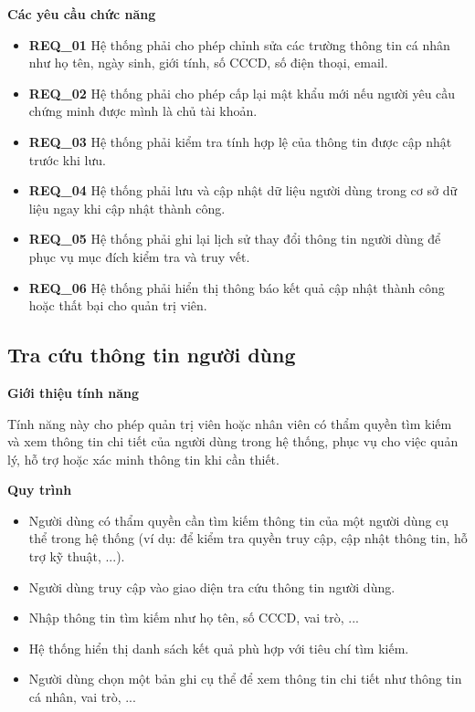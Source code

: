 \noindent \textbf{Các yêu cầu chức năng}

\begin{itemize} 
    \item \textbf{REQ\_01} Hệ thống phải cho phép chỉnh sửa các trường thông tin cá nhân như họ tên, ngày sinh, giới tính, số CCCD, số điện thoại, email. 
    \item \textbf{REQ\_02} Hệ thống phải cho phép cấp lại mật khẩu mới nếu người yêu cầu chứng minh được mình là chủ tài khoản. 
    \item \textbf{REQ\_03} Hệ thống phải kiểm tra tính hợp lệ của thông tin được cập nhật trước khi lưu. 
    \item \textbf{REQ\_04} Hệ thống phải lưu và cập nhật dữ liệu người dùng trong cơ sở dữ liệu ngay khi cập nhật thành công. 
    \item \textbf{REQ\_05} Hệ thống phải ghi lại lịch sử thay đổi thông tin người dùng để phục vụ mục đích kiểm tra và truy vết. 
    \item \textbf{REQ\_06} Hệ thống phải hiển thị thông báo kết quả cập nhật thành công hoặc thất bại cho quản trị viên.
\end{itemize}


\subsection{Tra cứu thông tin người dùng}

\noindent \textbf{Giới thiệu tính năng}

Tính năng này cho phép quản trị viên hoặc nhân viên có thẩm quyền tìm kiếm và xem thông tin chi tiết của người dùng trong hệ thống, phục vụ cho việc quản lý, hỗ trợ hoặc xác minh thông tin khi cần thiết.

\noindent \textbf{Quy trình}

\begin{itemize}

    \item Người dùng có thẩm quyền cần tìm kiếm thông tin của một người dùng cụ thể trong hệ thống (ví dụ: để kiểm tra quyền truy cập, cập nhật thông tin, hỗ trợ kỹ thuật, ...).

    \item Người dùng truy cập vào giao diện tra cứu thông tin người dùng.

    \item Nhập thông tin tìm kiếm như họ tên, số CCCD, vai trò, ...

    \item Hệ thống hiển thị danh sách kết quả phù hợp với tiêu chí tìm kiếm.

    \item Người dùng chọn một bản ghi cụ thể để xem thông tin chi tiết như thông tin cá nhân, vai trò, ...

\end{itemize}

